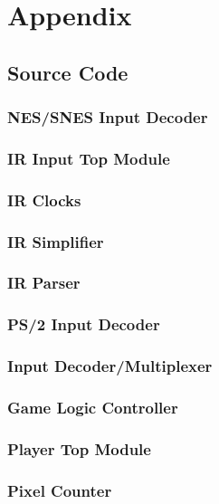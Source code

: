 \documentclass[]{article}
\begin{document}
\section{Appendix}
\subsection{Source Code}
\subsubsection{NES/SNES Input Decoder}

\subsubsection{IR Input Top Module}

\subsubsection{IR Clocks}

\subsubsection{IR Simplifier}

\subsubsection{IR Parser}

\subsubsection{PS/2 Input Decoder}

\subsubsection{Input Decoder/Multiplexer}

\subsubsection{Game Logic Controller}

\subsubsection{Player Top Module}

\subsubsection{Pixel Counter}

\end{document}
